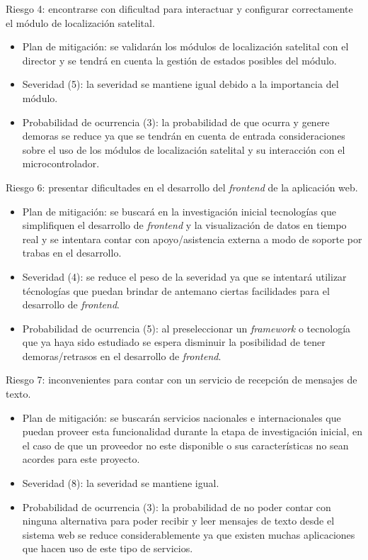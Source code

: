 \documentclass[
11pt, %
]{charter}
\begin{document}
Riesgo 4: encontrarse con dificultad para interactuar y configurar correctamente el módulo de localización satelital.
\begin{itemize}
	\item Plan de mitigación: se validarán los módulos de localización satelital con el director y se tendrá en cuenta la gestión de estados posibles del módulo.
	\item Severidad (5):  la severidad se mantiene igual debido a la importancia del módulo.
	\item Probabilidad de ocurrencia (3): la probabilidad de que ocurra y genere demoras se reduce ya que se tendrán en cuenta de entrada consideraciones sobre el uso de los módulos de localización satelital y su interacción con el microcontrolador.
\end{itemize}

Riesgo 6: presentar dificultades en el desarrollo del \textit{frontend} de la aplicación web.
\begin{itemize}
	\item Plan de mitigación: se buscará en la investigación inicial tecnologías que simplifiquen el desarrollo de \textit{frontend} y la visualización de datos en tiempo real y se intentara contar con apoyo/asistencia externa a modo de soporte por trabas en el desarrollo.
	\item Severidad (4): se reduce el peso de la severidad ya que se intentará utilizar técnologías que puedan brindar de antemano ciertas facilidades para el desarrollo de \textit{frontend}.
	\item Probabilidad de ocurrencia (5): al preseleccionar un \textit{framework} o tecnología que ya haya sido estudiado se espera disminuir la posibilidad de tener demoras/retrasos en el desarrollo de \textit{frontend}.
\end{itemize}

Riesgo 7: inconvenientes para contar con un servicio de recepción de mensajes de texto.
\begin{itemize}
	\item Plan de mitigación: se buscarán servicios nacionales e internacionales que puedan proveer esta funcionalidad durante la etapa de investigación inicial, en el caso de que un proveedor no este disponible o sus características no sean acordes para este proyecto. 
	\item Severidad (8): la severidad se mantiene igual.
	\item Probabilidad de ocurrencia (3): la probabilidad de no poder contar con ninguna alternativa para poder recibir y leer mensajes de texto desde el sistema web se reduce considerablemente ya que existen muchas aplicaciones que hacen uso de este tipo de servicios.
\end{itemize}
\end{document}
